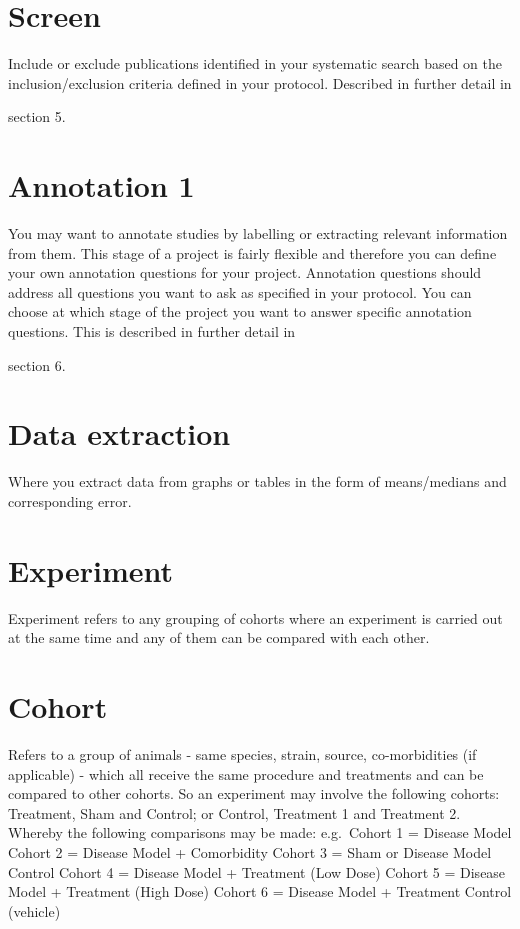 \documentclass[
]{book}
\begin{document}
\hypertarget{screen}{%
\section{Screen}\label{screen}}

Include or exclude publications identified in your systematic search based on the inclusion/exclusion criteria defined in your protocol. Described in further detail in

section 5.

\hypertarget{annotation-1}{%
\section{Annotation 1}\label{annotation-1}}

You may want to annotate studies by labelling or extracting relevant information from them. This stage of a project is fairly flexible and therefore you can define your own annotation questions for your project. Annotation questions should address all questions you want to ask as specified in your protocol. You can choose at which stage of the project you want to answer specific annotation questions. This is described in further detail in

section 6.

\hypertarget{data-extraction}{%
\section{Data extraction}\label{data-extraction}}

Where you extract data from graphs or tables in the form of means/medians and corresponding error.

\hypertarget{experiment}{%
\section{Experiment}\label{experiment}}

Experiment refers to any grouping of cohorts where an experiment is carried out at the same time and any of them can be compared with each other.

\hypertarget{cohort}{%
\section{Cohort}\label{cohort}}

Refers to a group of animals - same species, strain, source, co-morbidities (if applicable) - which all receive the same procedure and treatments and can be compared to other cohorts. So an experiment may involve the following cohorts: Treatment, Sham and Control; or Control, Treatment 1 and Treatment 2.
Whereby the following comparisons may be made:
e.g.~Cohort 1 = Disease Model
Cohort 2 = Disease Model + Comorbidity
Cohort 3 = Sham or Disease Model Control
Cohort 4 = Disease Model + Treatment (Low Dose)
Cohort 5 = Disease Model + Treatment (High Dose)
Cohort 6 = Disease Model + Treatment Control (vehicle)
\end{document}
